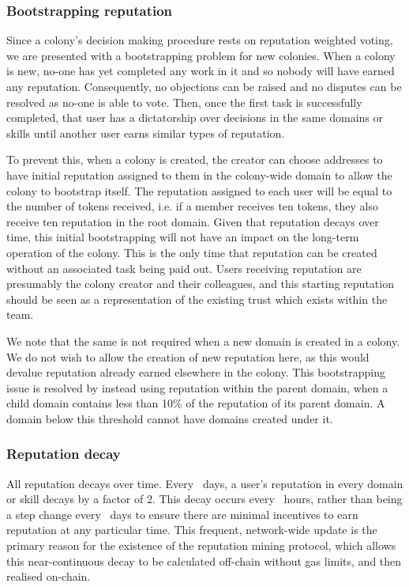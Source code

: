 \subsubsection{Bootstrapping reputation}\label{sec:bootstrapping-rep}
Since a colony's decision making procedure rests on reputation weighted voting, we are presented with a bootstrapping problem for new colonies. When a colony is new, no-one has yet completed any work in it and so nobody will have earned any reputation. Consequently, no objections can be raised and no disputes can be resolved as no-one is able to vote. Then, once the first task is successfully completed, that user has a dictatorship over decisions in the same domains or skills until another user earns similar types of reputation.

To prevent this, when a colony is created, the creator can choose addresses to have initial reputation assigned to them in the colony-wide domain to allow the colony to bootstrap itself. The reputation assigned to each user will be equal to the number of tokens received, i.e. if a member receives ten tokens, they also receive ten reputation in the root domain. Given that reputation decays over time, this initial bootstrapping will not have an impact on the long-term operation of the colony. This is the only time that reputation can be created without an associated task being paid out. Users receiving reputation are presumably the colony creator and their colleagues, and this starting reputation should be seen as a representation of the existing trust which exists within the team.

We note that the same is not required when a new domain is created in a colony. We do not wish to allow the creation of new reputation here, as this would devalue reputation already earned elsewhere in the colony. This bootstrapping issue is resolved by instead using reputation within the parent domain, when a child domain contains less than 10\% of the reputation of its parent domain. A domain below this threshold cannot have domains created under it.

\subsubsection{Reputation decay}
All reputation decays over time. Every \repdecayduration\ days, a user's reputation in every domain or skill decays by a factor of 2. This decay occurs every \miningcycleduration\ hours, rather than being a step change every \repdecayduration\ days to ensure there are minimal incentives to earn reputation at any particular time. This frequent, network-wide update is the primary reason for the existence of the reputation mining protocol, which allows this near-continuous decay to be calculated off-chain without gas limits, and then realised on-chain.

